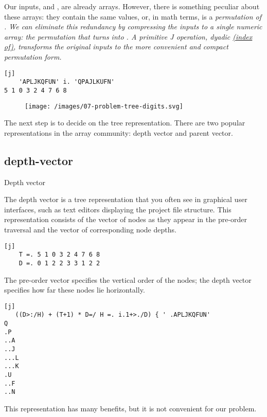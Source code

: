 \documentclass{article}
\begin{document}
Our inputs,  and , are already arrays.
However, there is something peculiar about these arrays: they contain the same values, or, in math terms,  is a \em{permutation} of .
We can eliminate this redundancy by compressing the inputs to a single numeric array: the permutation that turns  into .
A primitive J operation, dyadic \href{https://code.jsoftware.com/wiki/Vocabulary/idot#dyadic}{ (index of)}, transforms the original inputs to the more convenient and compact permutation form.

\begin{verbatim}[j]
    'APLJKQFUN' i. 'QPAJLKUFN'
5 1 0 3 2 4 7 6 8
\end{verbatim}

\begin{figure}[grayscale-diagram]
\texttt{[image: /images/07-problem-tree-digits.svg]}
\end{figure}

The next step is to decide on the tree representation.
There are two popular representations in the array community: depth vector and parent vector.

\subsection{depth-vector}{Depth vector}

The depth vector is a tree representation that you often see in graphical user interfaces, such as text editors displaying the project file structure.
This representation consists of the vector of nodes as they appear in the pre-order traversal and the vector of corresponding node depths.
\begin{verbatim}[j]
    T =. 5 1 0 3 2 4 7 6 8
    D =. 0 1 2 2 3 3 1 2 2
\end{verbatim}

The pre-order vector specifies the vertical order of the nodes; the depth vector specifies how far these nodes lie horizontally.
\begin{verbatim}[j]
   ((D>:/H) + (T+1) * D=/ H =. i.1+>./D) { ' .APLJKQFUN'
Q
.P
..A
..J
...L
...K
.U
..F
..N
\end{verbatim}

This representation has many benefits, but it is not convenient for our problem.
\end{document}

